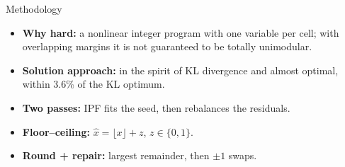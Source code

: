 \documentclass{article}
\newcommand{\Body}{\fontsize{34}{44}\selectfont}
\newlength{\colgap}\setlength{\colgap}{10mm}
\newlength{\colw}\setlength{\colw}{267.5mm}   %
\newlength{\bodyh}\setlength{\bodyh}{1050mm}
\newlength{\rowgap}\setlength{\rowgap}{9mm}
\newlength{\rowA}\setlength{\rowA}{352mm}
\begin{document}
\begin{minipage}[t][\bodyh][t]{\dimexpr 2\colw+\colgap\relax}
\begin{minipage}[t]{\colw}
\begin{pbox}[height=\rowA]{Methodology}
\begin{itemize}[itemsep=2.5mm]
      \vspace{1mm}
      {\centering\fontsize{38}{46}\selectfont
       $\displaystyle\min_{\hat{x}\in\mathbb{Z}_{\ge0}} D_{\mathrm{KL}}\!\left(\frac{\hat{x}}{N}\,\Big\|\,\frac{x}{N}\right)$\\[2mm]
       $\text{s.t.}\quad \sum_{k\in\mathcal{K}(s)}\hat{x}_k=b_s$\par}
\item \textbf{Why hard:} a nonlinear integer program with one variable per cell;
      with overlapping margins it is not guaranteed to be totally unimodular.
\item \textbf{Solution approach:} in the spirit of KL divergence and almost
      optimal, within 3.6\% of the KL optimum.
\end{itemize}
\vspace{2mm}
\begin{tcolorbox}[enhanced, colback=dtusand, colframe=dtured!60, boxrule=0.6mm,
  arc=2mm, left=5mm, right=5mm, top=2mm, bottom=2mm, fontupper=\Body\raggedright]
\begin{itemize}[itemsep=1mm]
\item \textbf{Two passes:} IPF fits the seed, then rebalances the residuals.
\item \textbf{Floor--ceiling:} $\hat{x}=\lfloor x\rfloor+z$, $z\in\{0,1\}$.
\item \textbf{Round + repair:} largest remainder, then $\pm1$ swaps.
\end{itemize}
\end{tcolorbox}
\end{pbox}
\end{minipage}

\vspace{\rowgap}


\end{minipage}
\end{document}
